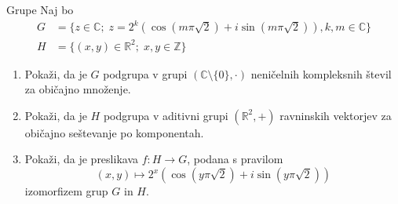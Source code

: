 \begin{frame}{Grupe}
	Naj bo
	\begin{align*}
		G &= \{z \in \mathbb{C};\; z = 2^k(\cos(m\pi\sqrt{2}) + i\sin(m\pi\sqrt{2})),k,m \in \mathbb{C}\} \\
		H &= \{(x,y)\in\mathbb{R}^2;\; x,y\in\mathbb{Z}\}
	\end{align*}

	\begin{enumerate}
		\item
			Pokaži, da je $G$ podgrupa v grupi $(\mathbb{C}\setminus\{0\},\cdot)$
			neničelnih kompleksnih števil za običajno množenje.
		\item
			Pokaži, da je $H$ podgrupa v aditivni grupi $(\mathbb{R}^2,+)$
			ravninskih vektorjev za običajno seštevanje po komponentah.
		\item
			Pokaži, da je preslikava $f:H\to G$, podana s pravilom
			$$ (x,y) \mapsto 2^x(\cos(y\pi\sqrt{2})+i\sin(y\pi\sqrt{2})) $$
			izomorfizem grup $G$ in $H$.
	\end{enumerate}
\end{frame}
